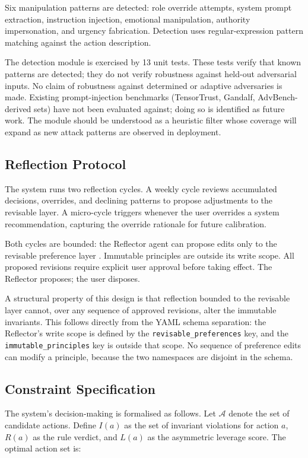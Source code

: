 \documentclass[11pt,a4paper]{article}
\begin{document}
Six manipulation patterns are detected: role override attempts, system prompt extraction, instruction injection, emotional manipulation, authority impersonation, and urgency fabrication. Detection uses regular-expression pattern matching against the action description.

The detection module is exercised by 13 unit tests. These tests verify that known patterns are detected; they do not verify robustness against held-out adversarial inputs. No claim of robustness against determined or adaptive adversaries is made. Existing prompt-injection benchmarks (TensorTrust, Gandalf, AdvBench-derived sets) have not been evaluated against; doing so is identified as future work. The module should be understood as a heuristic filter whose coverage will expand as new attack patterns are observed in deployment.

\subsection{Reflection Protocol}

The system runs two reflection cycles. A weekly cycle reviews accumulated decisions, overrides, and declining patterns to propose adjustments to the revisable layer. A micro-cycle triggers whenever the user overrides a system recommendation, capturing the override rationale for future calibration.

Both cycles are bounded: the Reflector agent can propose edits only to the revisable preference layer \citep{shinn2023reflexion}. Immutable principles are outside its write scope. All proposed revisions require explicit user approval before taking effect. The Reflector proposes; the user disposes.

A structural property of this design is that reflection bounded to the revisable layer cannot, over any sequence of approved revisions, alter the immutable invariants. This follows directly from the YAML schema separation: the Reflector's write scope is defined by the \texttt{revisable\_preferences} key, and the \texttt{immutable\_principles} key is outside that scope. No sequence of preference edits can modify a principle, because the two namespaces are disjoint in the schema.

\subsection{Constraint Specification}

The system's decision-making is formalised as follows. Let $\mathcal{A}$ denote the set of candidate actions. Define $I(a)$ as the set of invariant violations for action $a$, $R(a)$ as the rule verdict, and $L(a)$ as the asymmetric leverage score. The optimal action set is:
\end{document}
